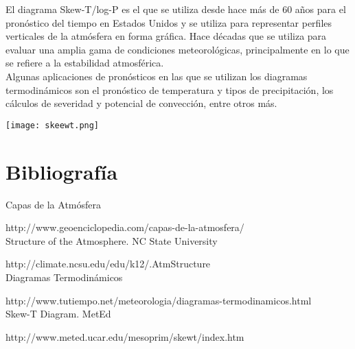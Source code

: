 \documentclass[12pt]{article}
\begin{document}
El diagrama Skew-T/log-P es el que se utiliza desde hace más de 60 años para el pronóstico del tiempo en Estados Unidos y se utiliza para representar perfiles verticales de la atmósfera en forma gráfica. Hace décadas que se utiliza para evaluar una amplia gama de condiciones meteorológicas, principalmente en lo que se refiere a la estabilidad atmosférica. \\

Algunas aplicaciones de pronósticos en las que se utilizan los diagramas termodinámicos son el  pronóstico de temperatura y tipos de precipitación, los cálculos de severidad y potencial de convección, entre otros más. \\

\begin{center}
\texttt{[image: skeewt.png]}
\end{center}

\pagebreak


\section{Bibliografía}
Capas de la Atmósfera

http://www.geoenciclopedia.com/capas-de-la-atmosfera/ \\

Structure of the Atmosphere. NC State University

http://climate.ncsu.edu/edu/k12/.AtmStructure \\

Diagramas Termodinámicos

http://www.tutiempo.net/meteorologia/diagramas-termodinamicos.html \\

Skew-T Diagram. MetEd

http://www.meted.ucar.edu/mesoprim/skewt/index.htm
\end{document}
